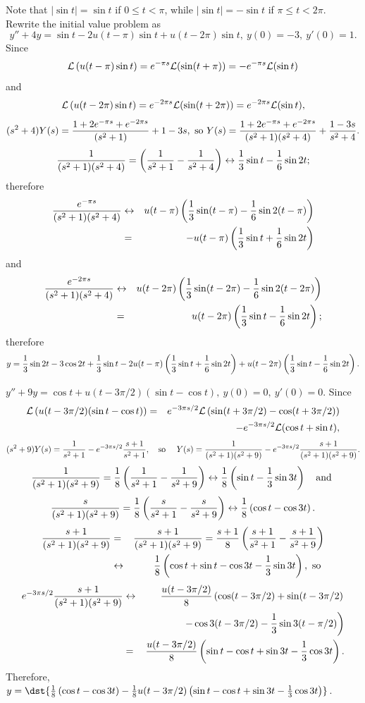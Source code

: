 \documentclass[dvips]{book}
\renewcommand{\exer}[1]{\par\medskip\;\noindent{\color{red}\bf #1.}}
\numberwithin{example}{section}
\numberwithin{equation}{section}
\numberwithin{theorem}{section}
\numberwithin{table}{section}
\numberwithin{figure}{section}
\begin{document}
\exer{8.5.6}
Note that $|\sin t|=\sin t$ if $0\le t<\pi$, while
 $|\sin t|=-\sin t$ if $\pi\le t<2\pi$. Rewrite the initial value
problem as
$$
y''+4y=\sin t-2u(t-\pi)\sin t+u(t-2\pi)\sin t,\ y(0)=-3,\ y'(0)=1.
$$
Since
$$
{\cal L}\left(u(t-\pi)\sin t\right)=e^{-\pi s}{\cal
L}(\sin(t+\pi))=-e^{-\pi s}{\cal L}(\sin t)
$$
 and
$$
{\cal L}\left(u(t-2\pi)\sin t\right)=e^{-2\pi s}{\cal
L}(\sin(t+2\pi))=e^{-2\pi s}{\cal L}(\sin t),
$$
$$
(s^2+4)Y(s)={1+2e^{-\pi s}+e^{-2\pi s}\over(s^2+1)}+1-3s,\mbox{ so }
Y(s)={1+2e^{-\pi s}+e^{-2\pi
s}\over(s^2+1)(s^2+4)}+{1-3s\over s^2+4}.
$$
$$
{1\over(s^2+1)(s^2+4)}=\left({1\over s^2+1}-{1\over s^2+4}\right)
\leftrightarrow {1\over3}\sin t-{1\over6}\sin2t;
$$
therefore
\begin{eqnarray*}
{e^{-\pi s}\over(s^2+1)(s^2+4)}
&\leftrightarrow&
u(t-\pi)\left({1\over3}\sin(t-\pi)-{1\over6}\sin2(t-\pi)\right)\\
&=&-u(t-\pi)\left({1\over3}\sin t+{1\over6}\sin2t\right)
\end{eqnarray*}
and
\begin{eqnarray*}
{e^{-2\pi s}\over(s^2+1)(s^2+4)}
&\leftrightarrow&
u(t-2\pi)\left({1\over3}\sin(t-2\pi)-{1\over6}\sin2(t-2\pi)\right)\\
&=&u(t-2\pi)\left({1\over3}\sin t-{1\over6}\sin2t\right);
\end{eqnarray*}
therefore
$$
y={1\over3}\sin2t-3\cos2t+{1\over3}\sin t
- 2 u(t-\pi)\left({1\over3}\sin t+{1\over6}\sin2t\right)
+u(t-2\pi)\left({1\over3}\sin
t-{1\over6}\sin2t\right).
$$


\exer{8.5.8}
 $y''+9y=\cos t+u(t-3\pi/2)(\sin t-\cos t),\ y(0)=0,\
y'(0)=0$. Since
\begin{eqnarray*}
{\cal L}\left(u(t-3\pi/2)(\sin t-\cos t)\right)&=&
e^{-3\pi s/2}{\cal
L}\left(\sin(t+3\pi/2)-\cos(t+3\pi/2)\right)\\
&&-e^{-3\pi s/2}{\cal L}(\cos t+\sin t),
\end{eqnarray*}
$$
(s^2+9)Y(s)={1\over s^2+1}-e^{-3\pi s/2}{s+1\over
s^2+1},\mbox{\quad so \quad}
Y(s)={1\over(s^2+1)(s^2+9)}-e^{-3\pi s/2}{s+1\over
(s^2+1)(s^2+9)}.
$$
$$
{1\over(s^2+1)(s^2+9)}={1\over8}\left({1\over s^2+1}-{1\over
s^2+9}\right)\leftrightarrow{1\over8}\left(\sin
t-{1\over3}\sin3t\right)\mbox{\quad and }
$$
$$
{s\over(s^2+1)(s^2+9)}={1\over8}\left({s\over s^2+1}-{s\over
s^2+9}\right)\leftrightarrow{1\over8}\left(\cos
t-\cos3t\right).
$$
\begin{eqnarray*}
{s+1\over(s^2+1)(s^2+9)}&=&{s+1\over(s^2+1)(s^2+9)}=
{s+1\over8}\left({s+1\over s^2+1}-{s+1\over
s^2+9}\right)\\ &\leftrightarrow&{1\over8}\left(\cos t+\sin
t-\cos3t-{1\over3}\sin3t\right),\mbox{ so }
\end{eqnarray*}
\begin{eqnarray*}
e^{-3\pi s/2}{s+1\over(s^2+1)(s^2+9)}&\leftrightarrow&
{u(t-3\pi/2)\over8}\left(\cos(t-3\pi/2)+\sin(t-3\pi/2)\right.\\
&&\left. -\cos3(t-3\pi/2)-{1\over3}\sin3(t-\pi/2)\right)\\
&=&{u(t-3\pi/2)\over8}\left(\sin t-\cos t+
\sin3t-{1\over3}\cos3t\right).
\end{eqnarray*}
Therefore,
$y=\dst{{1\over 8}\left(\cos t-\cos3t\right)
-{1\over8} u(t-3\pi/2)\left(\sin t-\cos t+
\sin 3t-{1\over3}\cos 3t\right)}$.
\end{document}
